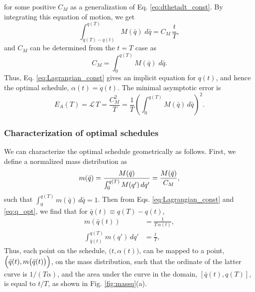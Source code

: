 \documentclass[preprint, superscriptaddress, floatfix]{revtex4-1}
\newcommand{\Err}{E}
\begin{document}
%
for some positive $C_M$
as a generalization of Eq. \eqref{eq:dthetadt_const}.
%
By integrating this equation of motion, we get
%
\begin{equation}
  \int_{ q(T) - q(t) }^{ q(T) }
    M(\bar q)
    \;
    d \bar q
  =
  C_M \, \frac t T
  ,
  \label{eq:q_opt}
\end{equation}
%
and $C_M$ can be determined from
the $t = T$ case as
%
\begin{equation}
  C_M =
  \int_{ 0 }^{ q(T) }
    M( \bar q )
    \;
    d \bar q
  .
  \label{eq:mint}
\end{equation}
%
Thus, Eq. \eqref{eq:Lagrangian_const}
gives an implicit equation for $q(t)$,
and hence the optimal schedule,
$\alpha(t) = \dot q(t)$.
%
The minimal asymptotic error is
%
\begin{equation}
  \Err_A(T)
  =
  \mathcal L \, T
  =
  \frac { C_M^2 } { T }
  =
  \frac 1 T
  \left(
    \int_0^{ q(T) } M(\bar q) \, d \bar q
  \right)^2
  .
\label{eq:error_asym2}
\end{equation}



\subsubsection{\label{sec:mass_distr}
Characterization of optimal schedules}



We can characterize the optimal schedule
geometrically as follows.
%
First, we define
a normalized mass distribution as
%
\begin{equation}
  m(\bar q)
  =
  \frac{
    M(\bar q)
  }
  {
    \int_0^{ q(T) } M(q') \, d q'
  }
  =
  \frac{
    M(\bar q)
  }
  {
    C_M
  }
  ,
\notag
\end{equation}
%
such that
$\int_0^{q(T)} m(\bar q) \, d\bar q = 1$.
%
Then from Eqs. \eqref{eq:Lagrangian_const} and \eqref{eq:q_opt},
we find that for $\bar q(t) \equiv q(T) - q(t)$,
%
\begin{align}
  m\left( \bar q(t) \right)
  &=
  \frac{ 1 }
       { T \, \alpha(t) }
  ,
  \label{eq:mQ_invTa}
  \\
  \int_{\bar q(t)}^{ q(T) }
    m(q') \, d q'
  &=
  \frac t T
  ,
  \label{eq:intmQ_tT}
\end{align}
%
Thus, each point on the schedule,
$\bigl(t, \alpha(t)\bigr)$,
can be mapped to a point,
$\Bigl(\bar q(t), m\bigl(\bar q(t)\bigr)\Bigr)$,
on the mass distribution,
such that the ordinate of the latter curve
is $1/(T\alpha)$,
and the area under the curve in the domain, $[\bar q(t), q(T)]$,
is equal to $t/T$,
as shown in Fig. \ref{fig:massq}(a).
\end{document}
